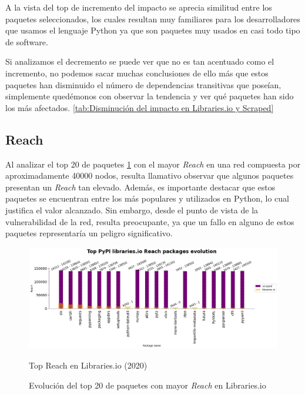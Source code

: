 A la vista del top de incremento del impacto se aprecia similitud entre los paquetes seleccionados,
los cuales resultan muy familiares para los desarrolladores que usamos el lenguaje Python ya que
son paquetes muy usados en casi todo tipo de software.

Si analizamos el decremento se puede ver que no es tan acentuado como el incremento, no
podemos sacar muchas conclusiones de ello más que estos paquetes han disminuido el número de
dependencias transitivas que poseían, simplemente quedémonos con observar la tendencia y ver qué
paquetes han sido los más afectados. \ref{tab:Disminución del impacto en Libraries.io y Scraped}


\subsection{Reach}

Al analizar el top 20 de paquetes \ref{fig:Top Reach en Libraries.io} con el mayor \textit{Reach} en una
red compuesta por aproximadamente 40000 nodos, resulta llamativo observar que algunos paquetes
presentan un \textit{Reach} tan elevado. Además, es importante destacar que estos paquetes se
encuentran entre los más populares y utilizados en Python, lo cual justifica el valor alcanzado.
Sin embargo, desde el punto de vista de la vulnerabilidad de la red, resulta preocupante, ya que
un fallo en alguno de estos paquetes representaría un peligro significativo.

\begin{figure}[ht!]
    \begin{center}
        \includegraphics[width=1\textwidth]{img/pypi/top_librariesio_reach_evolution.png}
        \caption{Top Reach en Libraries.io (2020)}
    \end{center}
    \label{fig:Top Reach en Libraries.io}
    \caption{Evolución del top 20 de paquetes con mayor \textit{Reach} en Libraries.io}
\end{figure}

